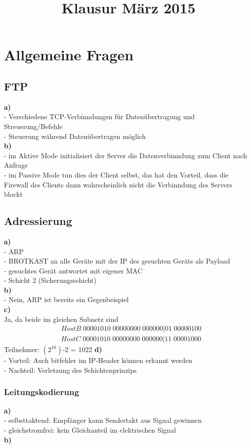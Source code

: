 \documentclass{article}
\title{Klausur M\"arz 2015}
\begin{document}
	\maketitle
	\section{Allgemeine Fragen}
		\subsection{FTP}
			\textbf{a)}\\
				- Verschiedene TCP-Verbinndungen f\"ur Daten\"ubertragung und Streuerung/Befehle\\
				- Steuerung w\"ahrend Daten\"ubertragen m\"oglich\\
			\textbf{b)}\\
				- im Aktive Mode initialisiert der Server die Datenverbinndung zum Client nach Anfrage\\
				- im Passive Mode tun dies der Client selbst, das hat den Vorteil, dass die Firewall des Clients dann wahrscheinlich nicht die Verbinndung des Servers blockt\\
		\subsection{Adressierung}
			\textbf{a)}\\
				- ARP \\
				- BROTKAST an alle Ger\"ate mit der IP des gesuchten Ger\"ats als Payload\\
				- gesuchtes Ger\"at antwortet mit eigener MAC\\
				- Schicht 2 (Sicherungsschicht)\\
			\textbf{b)}\\
				- Nein, ARP ist bereits ein Gegenbeispiel\\
			\textbf{c)}\\
				Ja, da beide im gleichen Subnetz sind
				\begin{align*}
					&HostB\;00001010\;00000000\;000000|01\;00000100 \\
					&HostC\;00001010\;00000000\;000000|11\;00001000
				\end{align*}
				Teilnehmer: $(2^10)$-2 = 1022
			\textbf{d)}\\
				- Vorteil: Auch bitfehler im IP-Header k\"onnen erkannt werden\\
				- Nachteil: Verletzung des Schichtenprinzips
		\subsubsection{Leitungskodierung}
			\textbf{a)}\\
				- selbsttaktend: Empfänger kann Sendertakt aus Signal gewinnen \\
				- gleichstromfrei: kein Gleichanteil im elektrischen Signal \\
			\textbf{b)}\\
				
\end{document}
